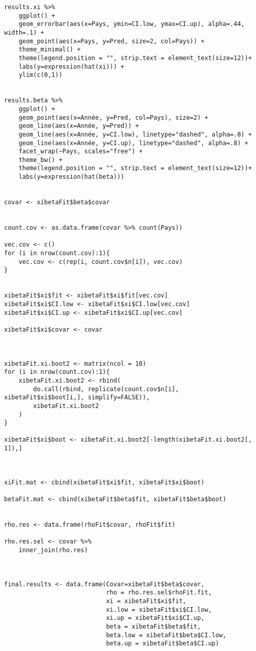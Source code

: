 \begin{lstlisting}
results.xi %>% 
    ggplot() + 
    geom_errorbar(aes(x=Pays, ymin=CI.low, ymax=CI.up), alpha=.44, width=.1) +
    geom_point(aes(x=Pays, y=Pred, size=2, col=Pays)) + 
    theme_minimal() + 
    theme(legend.position = "", strip.text = element_text(size=12))+ 
    labs(y=expression(hat(xi))) +
    ylim(c(0,1))
    

results.beta %>% 
    ggplot() + 
    geom_point(aes(x=Année, y=Pred, col=Pays), size=2) + 
    geom_line(aes(x=Année, y=Pred)) + 
    geom_line(aes(x=Année, y=CI.low), linetype="dashed", alpha=.8) + 
    geom_line(aes(x=Année, y=CI.up), linetype="dashed", alpha=.8) + 
    facet_wrap(~Pays, scales="free") + 
    theme_bw() + 
    theme(legend.position = "", strip.text = element_text(size=12))+ 
    labs(y=expression(hat(beta)))
    
    
covar <- xibetaFit$beta$covar 


count.cov <- as.data.frame(covar %>% count(Pays))

vec.cov <- c()
for (i in nrow(count.cov):1){
    vec.cov <- c(rep(i, count.cov$n[i]), vec.cov)
}


xibetaFit$xi$fit <- xibetaFit$xi$fit[vec.cov]
xibetaFit$xi$CI.low <- xibetaFit$xi$CI.low[vec.cov]
xibetaFit$xi$CI.up <- xibetaFit$xi$CI.up[vec.cov]

xibetaFit$xi$covar <- covar



xibetaFit.xi.boot2 <- matrix(ncol = 10)
for (i in nrow(count.cov):1){
    xibetaFit.xi.boot2 <- rbind(
        do.call(rbind, replicate(count.cov$n[i], xibetaFit$xi$boot[i,], simplify=FALSE)),
        xibetaFit.xi.boot2
    )
}

xibetaFit$xi$boot <- xibetaFit.xi.boot2[-length(xibetaFit.xi.boot2[, 1]),]



xiFit.mat <- cbind(xibetaFit$xi$fit, xibetaFit$xi$boot)

betaFit.mat <- cbind(xibetaFit$beta$fit, xibetaFit$beta$boot)


rho.res <- data.frame(rhoFit$covar, rhoFit$fit)

rho.res.sel <- covar %>% 
    inner_join(rho.res)



final.results <- data.frame(Covar=xibetaFit$beta$covar,
                            rho = rho.res.sel$rhoFit.fit,
                            xi = xibetaFit$xi$fit,
                            xi.low = xibetaFit$xi$CI.low,
                            xi.up = xibetaFit$xi$CI.up,
                            beta = xibetaFit$beta$fit,
                            beta.low = xibetaFit$beta$CI.low,
                            beta.up = xibetaFit$beta$CI.up)






\end{lstlisting}
